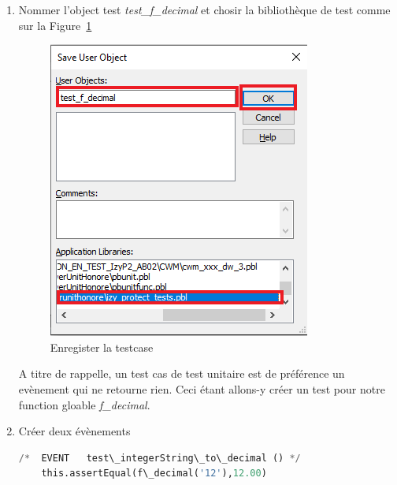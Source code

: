\documentclass[french]{article}
\theoremstyle{definition}
\begin{document}
\begin{enumerate}
  \item Nommer l'object test \textit{test\_f\_decimal} et chosir la bibliothèque de test comme sur la Figure~\ref{fig:nameTestObject}
  \begin{figure}[!htbp]
    \begin{center}
    \includegraphics[width=.8\linewidth]{./nameTestObject.png}
    \caption{Enregister la testcase}
    \label{fig:nameTestObject}
    \end{center}
  \end{figure} 
A titre de rappelle, un test cas de test unitaire est de préférence un evènement  qui ne retourne rien. 
Ceci étant allons-y créer un test pour notre function gloable \textit{f\_decimal}.
\item Créer deux évènements
\begin{lstlisting}[language=Python, caption= f\_decimal test 1]
    /*	EVENT	test\_integerString\_to\_decimal ()	*/
    this.assertEqual(f\_decimal('12'),12.00)
\end{lstlisting}


\end{enumerate}
\end{document}
